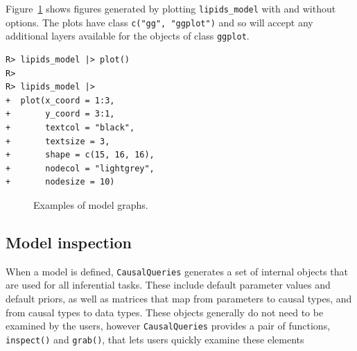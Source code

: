\documentclass[
  11pt,
  article]{jss}
\begin{document}
Figure~\ref{fig-plots} shows figures generated by plotting
\texttt{lipids\_model} with and without options. The plots have class
\texttt{c("gg",\ "ggplot")} and so will accept any additional layers
available for the objects of class \texttt{ggplot}.

\begin{verbatim}
R> lipids_model |> plot()
R> 
R> lipids_model |>
+  plot(x_coord = 1:3,
+       y_coord = 3:1,
+       textcol = "black",
+       textsize = 3,
+       shape = c(15, 16, 16),
+       nodecol = "lightgrey",
+       nodesize = 10)
\end{verbatim}

\begin{figure}[h]

\begin{minipage}{0.50\linewidth}



\end{minipage}%
%
\begin{minipage}{0.50\linewidth}



\end{minipage}%

\caption{\label{fig-plots}Examples of model graphs.}

\end{figure}%

\subsection{Model inspection}\label{model-inspection}

When a model is defined, \texttt{CausalQueries} generates a set of
internal objects that are used for all inferential tasks. These include
default parameter values and default priors, as well as matrices that
map from parameters to causal types, and from causal types to data
types. These objects generally do not need to be examined by the users,
however \texttt{CausalQueries} provides a pair of functions,
\texttt{inspect()} and \texttt{grab()}, that lets users quickly examine
these elements
\end{document}
